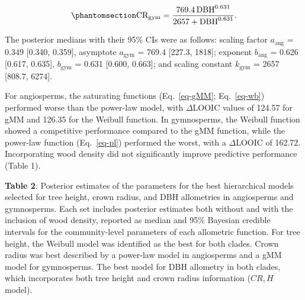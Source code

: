 \documentclass[
  12pt,
  letterpaper,
  DIV=11,
  numbers=noendperiod]{scrartcl}
\begin{document}
\begin{equation}\phantomsection\label{eq-cr_gym}{
\mathrm{CR_{gym}} = \frac{\mathrm{769.4}
\, \mathrm{DBH}^{\mathrm{0.631}}}
{\mathrm{2657}
+ \mathrm{DBH}^{\mathrm{0.631}}}.
}\end{equation}

The posterior medians with their 95\% CIs were as follows: scaling
factor \(a_{\text{ang}}\) = 0.349 {[}0.340, 0.359{]}, asymptote
\(a_{\text{gym}}\) = 769.4 {[}227.3, 1818{]}; exponent
\(b_{\text{ang}}\) = 0.626 {[}0.617, 0.635{]}, \(b_{\text{gym}}\) =
0.631 {[}0.600, 0.663{]}; and scaling constant \(k_{\text{gym}}\) = 2657
{[}808.7, 6274{]}.

For angiosperms, the saturating functions (Eq.~\ref{eq-gMM};
Eq.~\ref{eq-wb}) performed worse than the power-law model, with
\(\Delta\)LOOIC values of 124.57 for gMM and 126.35 for the Weibull
function. In gymnosperms, the Weibull function showed a competitive
performance compared to the gMM function, while the power-law function
(Eq.~\ref{eq-pl}) performed the worst, with a \(\Delta\)LOOIC of 162.72.
Incorporating wood density did not significantly improve predictive
performance (Table 1).

\textbf{Table 2}: Posterior estimates of the parameters for the best
hierarchical models selected for tree height, crown radius, and DBH
allometries in angiosperms and gymnosperms. Each set includes posterior
estimates both without and with the inclusion of wood density, reported
as median and 95\% Bayesian credible intervals for the community-level
parameters of each allometric function. For tree height, the Weibull
model was identified as the best for both clades. Crown radius was best
described by a power-law model in angiosperms and a gMM model for
gymnosperms. The best model for DBH allometry in both clades, which
incorporates both tree height and crown radius information (\(CR,H\)
model).

\newpage

\begingroup\fontsize{10}{12}\selectfont
\end{document}

